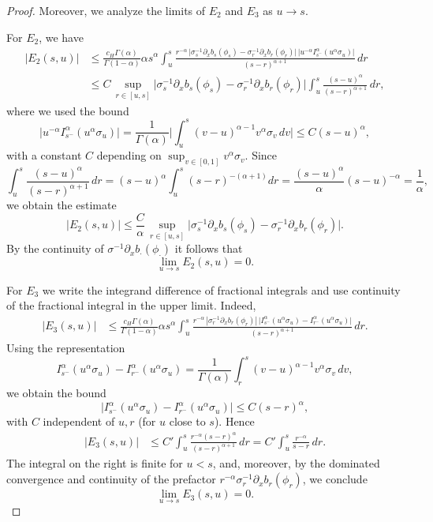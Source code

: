 \documentclass[preprint,12pt]{elsarticle}
\theoremstyle{definition}  %
\theoremstyle{plain}  %
\begin{document}
\begin{proof}
Moreover, we analyze the limits of \(E_2\) and \(E_3\) as \(u\to s\).

For \(E_2\), we have
\begin{align*}
    |E_2(s,u)|
    &\le \frac{c_H\Gamma(\alpha)}{\Gamma(1-\alpha)}\alpha s^\alpha
    \int_u^s \frac{ r^{-\alpha}\, \big|\sigma_s^{-1}\partial_x b_s(\phi_s)-\sigma_r^{-1}\partial_x b_r(\phi_r)\big|
    \,\big|u^{-\alpha}I_{s^-}^\alpha(u^\alpha\sigma_u)\big|}{(s-r)^{\alpha+1}}\,dr\\
    &\le C\,\sup_{r\in[u,s]}\big|\sigma_s^{-1}\partial_x b_s(\phi_s)-\sigma_r^{-1}\partial_x b_r(\phi_r)\big|
    \int_u^s \frac{(s-u)^\alpha}{(s-r)^{\alpha+1}}\,dr,
\end{align*}
where we used the bound
\[
\big|u^{-\alpha}I_{s^-}^\alpha(u^\alpha\sigma_u)\big|
= \frac{1}{\Gamma(\alpha)}\Big|\int_u^s (v-u)^{\alpha-1} v^\alpha\sigma_v\,dv\Big|
\le C (s-u)^\alpha,
\]
with a constant \(C\) depending on \(\sup_{v\in[0,1]} v^\alpha\sigma_v\). Since
\[
\int_u^s \frac{(s-u)^\alpha}{(s-r)^{\alpha+1}}\,dr = (s-u)^\alpha\int_u^s (s-r)^{-(\alpha+1)}dr
= \frac{(s-u)^\alpha}{\alpha}(s-u)^{-\alpha}=\frac{1}{\alpha},
\]
we obtain the estimate
\[
|E_2(s,u)| \le \frac{C}{\alpha}\,\sup_{r\in[u,s]}\big|\sigma_s^{-1}\partial_x b_s(\phi_s)-\sigma_r^{-1}\partial_x b_r(\phi_r)\big|.
\]
By the continuity of \(\sigma^{-1}\partial_x b_\cdot(\phi_\cdot)\) it follows that
\[
\lim_{u\to s} E_2(s,u)=0.
\]

For \(E_3\) we write the integrand difference of fractional integrals and use continuity of the fractional integral in the upper limit. Indeed,
\begin{align*}
    |E_3(s,u)|
    &\le \frac{c_H\Gamma(\alpha)}{\Gamma(1-\alpha)}\alpha s^\alpha
    \int_u^s \frac{ r^{-\alpha}\,|\sigma_r^{-1}\partial_x b_r(\phi_r)|\,
    \big|I_{s^-}^\alpha(u^\alpha\sigma_u)- I_{r^-}^\alpha(u^\alpha\sigma_u)\big|}{(s-r)^{\alpha+1}}\,dr.
\end{align*}
Using the representation
\[
I_{s^-}^\alpha(u^\alpha\sigma_u)- I_{r^-}^\alpha(u^\alpha\sigma_u)
= \frac{1}{\Gamma(\alpha)}\int_r^s (v-u)^{\alpha-1} v^\alpha\sigma_v\,dv,
\]
we obtain the bound
\[
\big|I_{s^-}^\alpha(u^\alpha\sigma_u)- I_{r^-}^\alpha(u^\alpha\sigma_u)\big|
\le C (s-r)^\alpha,
\]
with \(C\) independent of \(u,r\) (for \(u\) close to \(s\)). Hence
\begin{align*}
    |E_3(s,u)|
    &\le C' \int_u^s \frac{ r^{-\alpha} (s-r)^\alpha}{(s-r)^{\alpha+1}}\,dr
    = C' \int_u^s \frac{r^{-\alpha}}{s-r}\,dr.
\end{align*}
The integral on the right is finite for \(u<s\), and, moreover, by the dominated convergence and continuity of the prefactor \(r^{-\alpha}\sigma_r^{-1}\partial_x b_r(\phi_r)\), we conclude
\[
\lim_{u\to s} E_3(s,u)=0.
\]


\end{proof}
\end{document}
